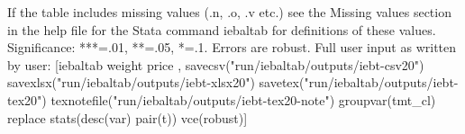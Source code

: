 If the table includes missing values (.n, .o, .v etc.) see the Missing values section in the help file for the Stata command iebaltab for definitions of these values. Significance: ***=.01, **=.05, *=.1. Errors are robust. Full user input as written by user: [iebaltab weight price , savecsv("run/iebaltab/outputs/iebt-csv20") savexlsx("run/iebaltab/outputs/iebt-xlsx20") savetex("run/iebaltab/outputs/iebt-tex20") texnotefile("run/iebaltab/outputs/iebt-tex20-note") groupvar(tmt\_cl) replace stats(desc(var) pair(t)) vce(robust)] 
